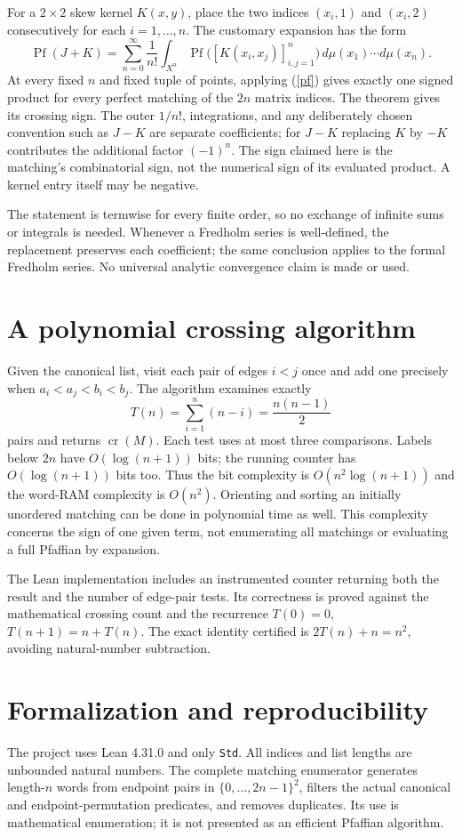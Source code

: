 \documentclass[11pt]{article}
\newcommand{\crs}{\operatorname{cr}}
\begin{document}
For a $2\times2$ skew kernel $K(x,y)$, place the two indices $(x_i,1)$ and $(x_i,2)$ consecutively for each $i=1,\ldots,n$. The customary expansion has the form
\[
\operatorname{Pf}(J+K)=\sum_{n=0}^{\infty}\frac1{n!}
  \int_{X^n}\operatorname{Pf}\bigl([K(x_i,x_j)]_{i,j=1}^{n}\bigr)
  \,d\mu(x_1)\cdots d\mu(x_n).
\]
At every fixed $n$ and fixed tuple of points, applying (\ref{pf}) gives exactly one signed product for every perfect matching of the $2n$ matrix indices. The theorem gives its crossing sign. The outer $1/n!$, integrations, and any deliberately chosen convention such as $J-K$ are separate coefficients; for $J-K$ replacing $K$ by $-K$ contributes the additional factor $(-1)^n$. The sign claimed here is the matching's combinatorial sign, not the numerical sign of its evaluated product. A kernel entry itself may be negative.

The statement is termwise for every finite order, so no exchange of infinite sums or integrals is needed. Whenever a Fredholm series is well-defined, the replacement preserves each coefficient; the same conclusion applies to the formal Fredholm series. No universal analytic convergence claim is made or used.

\section{A polynomial crossing algorithm}
Given the canonical list, visit each pair of edges $i<j$ once and add one precisely when $a_i<a_j<b_i<b_j$. The algorithm examines exactly
\[
T(n)=\sum_{i=1}^n(n-i)=\frac{n(n-1)}2
\]
pairs and returns $\crs(M)$. Each test uses at most three comparisons. Labels below $2n$ have $O(\log(n+1))$ bits; the running counter has $O(\log(n+1))$ bits too. Thus the bit complexity is $O(n^2\log(n+1))$ and the word-RAM complexity is $O(n^2)$. Orienting and sorting an initially unordered matching can be done in polynomial time as well. This complexity concerns the sign of one given term, not enumerating all matchings or evaluating a full Pfaffian by expansion.

The Lean implementation includes an instrumented counter returning both the result and the number of edge-pair tests. Its correctness is proved against the mathematical crossing count and the recurrence $T(0)=0$, $T(n+1)=n+T(n)$. The exact identity certified is $2T(n)+n=n^2$, avoiding natural-number subtraction.

\section{Formalization and reproducibility}
The project uses Lean 4.31.0 and only \texttt{Std}. All indices and list lengths are unbounded natural numbers. The complete matching enumerator generates length-$n$ words from endpoint pairs in $\{0,\ldots,2n-1\}^2$, filters the actual canonical and endpoint-permutation predicates, and removes duplicates. Its use is mathematical enumeration; it is not presented as an efficient Pfaffian algorithm.
\end{document}
